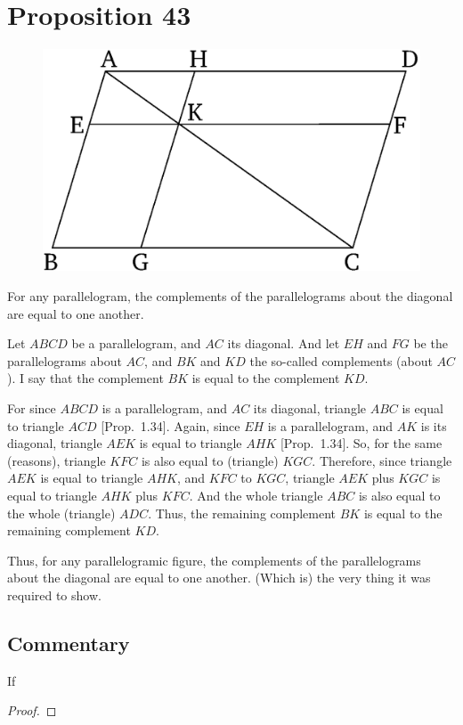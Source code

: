 \chapter*{Proposition 43}



\begin{figure}[ht]
    \begin{center}
    \includegraphics[width=0.5\linewidth]{figures/fig43e.eps}
    \label{fig:prop_43}
    \end{center}
\end{figure}

For any parallelogram, the complements of the parallelograms about the diagonal are equal to one another.

Let $ABCD$ be a parallelogram, and $AC$ its diagonal. And let $EH$ and $FG$
be the parallelograms about  $AC$, and $BK$ and $KD$ the so-called complements
(about $AC$).
I say that the complement $BK$ is equal to the complement $KD$.

For since $ABCD$ is a parallelogram, and $AC$ its diagonal,  triangle
$ABC$ is equal to triangle $ACD$ [Prop.~1.34]. Again, since $EH$ is
a parallelogram, and $AK$ is its diagonal, triangle $AEK$ is equal to
triangle $AHK$ [Prop.~1.34]. So, for the same (reasons), triangle
$KFC$ is also equal to (triangle) $KGC$. Therefore, since triangle $AEK$ is
equal to triangle $AHK$, and $KFC$ to $KGC$, triangle $AEK$ plus $KGC$ is
equal to triangle $AHK$ plus $KFC$. And the whole triangle $ABC$ is
also equal to the whole (triangle) $ADC$. Thus, the remaining complement
$BK$ is equal to the remaining complement $KD$.

Thus, for any parallelogramic figure, the complements of the
parallelograms about the diagonal are equal to one another.
(Which is) the very thing it was required to show.


\section*{Commentary}

\begin{proposition}\label{proposition_43}\leanok
    If
\end{proposition}
\begin{proof}
    \leanok
\end{proof}
